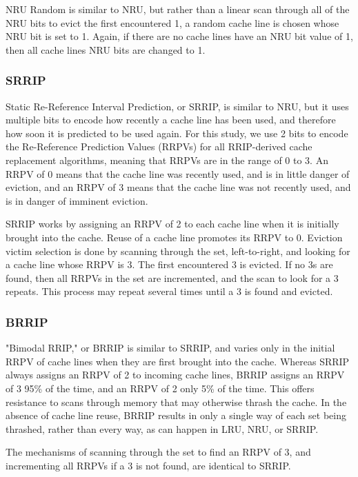 NRU Random is similar to NRU, but rather than a linear scan through all of the NRU bits to evict the first encountered 1, a random cache line is chosen whose NRU bit is set to 1.  Again, if there are no cache lines have an NRU bit value of 1, then all cache lines NRU bits are changed to 1.

\subsubsection{SRRIP}

Static Re-Reference Interval Prediction, or SRRIP, is similar to NRU, but it uses multiple bits to encode how recently a cache line has been used, and therefore how soon it is predicted to be used again.  For this study, we use 2 bits to encode the Re-Reference Prediction Values (RRPVs) for all RRIP-derived cache replacement algorithms, meaning that RRPVs are in the range of 0 to 3.  An RRPV of 0 means that the cache line was recently used, and is in little danger of eviction, and an RRPV of 3 means that the cache line was not recently used, and is in danger of imminent eviction.

SRRIP works by assigning an RRPV of 2 to each cache line when it is initially brought into the cache.  Reuse of a cache line promotes its RRPV to 0.  Eviction victim selection is done by scanning through the set, left-to-right, and looking for a cache line whose RRPV is 3.  The first encountered 3 is evicted.  If no 3s are found, then all RRPVs in the set are incremented, and the scan to look for a 3 repeats.  This process may repeat several times until a 3 is found and evicted.

\subsubsection{BRRIP}

"Bimodal RRIP," or BRRIP is similar to SRRIP, and varies only in the initial RRPV of cache lines when they are first brought into the cache.  Whereas SRRIP always assigns an RRPV of 2 to incoming cache lines, BRRIP assigns an RRPV of 3 95\% of the time, and an RRPV of 2 only 5\% of the time.  This offers resistance to scans through memory that may otherwise thrash the cache.  In the absence of cache line reuse, BRRIP results in only a single way of each set being thrashed, rather than every way, as can happen in LRU, NRU, or SRRIP.

The mechanisms of scanning through the set to find an RRPV of 3, and incrementing all RRPVs if a 3 is not found, are identical to SRRIP.

